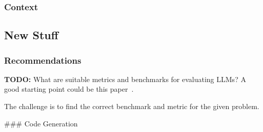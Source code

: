 \documentclass[11pt]{article}
\begin{document}
\subsubsection{Context}


\subsection{New Stuff}


\subsubsection{Recommendations}





\textbf{TODO:} What are suitable metrics and benchmarks for evaluating LLMs? A good starting point could be this paper~\cite{10.1145/3695988}.


%

The challenge is to find the correct benchmark and metric for the given problem.

### Code Generation
\end{document}
